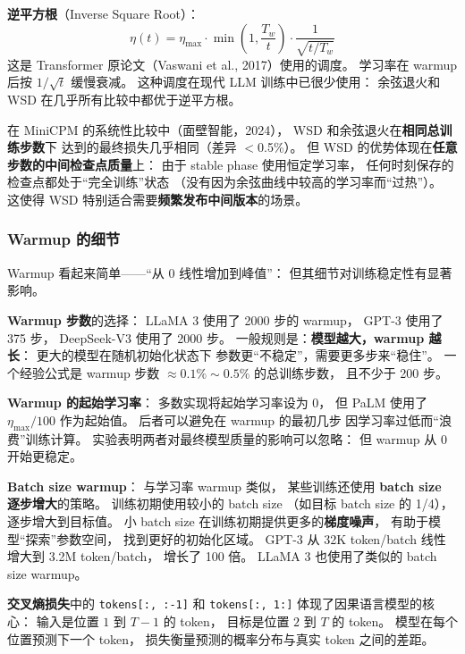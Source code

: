 \textbf{逆平方根}（Inverse Square Root）：
\begin{equation}
  \eta(t) = \eta_{\max} \cdot \min\left(1, \frac{T_w}{t}\right) \cdot \frac{1}{\sqrt{t / T_w}}
\end{equation}
这是 Transformer 原论文（Vaswani et al., 2017）使用的调度。
学习率在 warmup 后按 $1/\sqrt{t}$ 缓慢衰减。
这种调度在现代 LLM 训练中已很少使用：
余弦退火和 WSD 在几乎所有比较中都优于逆平方根。

在 MiniCPM 的系统性比较中（面壁智能，2024），
WSD 和余弦退火在\textbf{相同总训练步数}下
达到的最终损失几乎相同（差异 $<$0.5\%）。
但 WSD 的优势体现在\textbf{任意步数的中间检查点质量}上：
由于 stable phase 使用恒定学习率，
任何时刻保存的检查点都处于“完全训练”状态
（没有因为余弦曲线中较高的学习率而“过热”）。
这使得 WSD 特别适合需要\textbf{频繁发布中间版本}的场景。

\subsubsection{Warmup 的细节}

Warmup 看起来简单——“从 0 线性增加到峰值”：
但其细节对训练稳定性有显著影响。

\textbf{Warmup 步数}的选择：
LLaMA 3 使用了 2000 步的 warmup，
GPT-3 使用了 375 步，
DeepSeek-V3 使用了 2000 步。
一般规则是：\textbf{模型越大，warmup 越长}：
更大的模型在随机初始化状态下
参数更“不稳定”，需要更多步来“稳住”。
一个经验公式是 warmup 步数 $\approx 0.1\% \sim 0.5\%$ 的总训练步数，
且不少于 200 步。

\textbf{Warmup 的起始学习率}：
多数实现将起始学习率设为 0，
但 PaLM 使用了 $\eta_{\max}/100$ 作为起始值。
后者可以避免在 warmup 的最初几步
因学习率过低而“浪费”训练计算。
实验表明两者对最终模型质量的影响可以忽略：
但 warmup 从 0 开始更稳定。

\textbf{Batch size warmup}：
与学习率 warmup 类似，
某些训练还使用 \textbf{batch size 逐步增大}的策略。
训练初期使用较小的 batch size
（如目标 batch size 的 1/4），
逐步增大到目标值。
小 batch size 在训练初期提供更多的\textbf{梯度噪声}，
有助于模型“探索”参数空间，
找到更好的初始化区域。
GPT-3 从 32K token/batch 线性增大到 3.2M token/batch，
增长了 100 倍。
LLaMA 3 也使用了类似的 batch size warmup。

\textbf{交叉熵损失}中的 \texttt{tokens[:, :-1]} 和
\texttt{tokens[:, 1:]} 体现了因果语言模型的核心：
输入是位置 $1$ 到 $T-1$ 的 token，
目标是位置 $2$ 到 $T$ 的 token。
模型在每个位置预测下一个 token，
损失衡量预测的概率分布与真实 token 之间的差距。


